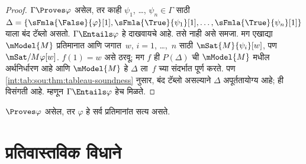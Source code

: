 \begin{proof}
  $\Gamma \Proves \varphi$ असेल,
  तर काही
  $\psi_1$, \dots, $\psi_n \in
  \Gamma$ साठी
  $\Delta = \{\sFmla{\False}{\varphi}[1], \sFmla{\True}{\psi_1}[1],
  \dots, \sFmla{\True}{\psi_n}[1]\}$
  याला बंद टॅब्लो असतो.
  $\Gamma \Entails \varphi$
  हे दाखवायचे आहे. तसे नाही
  असे समजा. मग एखाद्या
  $\mModel{M}$ प्रतिमानात
  आणि जगात~$w$,
  $i=1$, \dots,~$n$ साठी
  $\mSat{M}{\psi_i}[w]$,
  पण $\mSat/{M}{\varphi}[w]$.
  $f(1) = w$ असे ठरवू;
  मग $f$ ही
  $P(\Delta)$ ची
  $\mModel{M}$ मधील
  अर्थनिर्धारण आहे आणि
  $\mModel{M}$ हे
  $\Delta$ ला~$f$ च्या
  संदर्भात पूर्ण करते.
  पण \ref{int:tab:sou:thm:tableau-soundness}
  नुसार, बंद टॅब्लो
  असल्याने $\Delta$
  अपूर्ततायोग्य आहे; ही
  विसंगती आहे. म्हणून
  $\Gamma \Entails \varphi$
  हेच मिळते.
\end{proof}

\begin{cor}
\label{int:tab:sou:cor:weak-soundness}
$\Proves \varphi$ असेल, तर
$\varphi$ हे सर्व प्रतिमानांत
सत्य असते.
\end{cor}



\part{प्रतिवास्तविक विधाने}\label{cnt:part}
